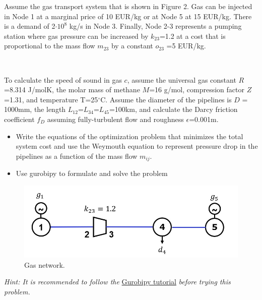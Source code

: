 \documentclass[10pt]{article}
\newenvironment{problem}[2][Problem]{\begin{trivlist}
\item[\hskip \labelsep {\bfseries #1}\hskip \labelsep {\bfseries #2.}]}{\end{trivlist}}
\begin{document}
\begin{problem}{6.3}

Assume the gas transport system that is shown in Figure 2. Gas can be injected in Node 1 at a marginal price of 10 EUR/kg or at Node 5 at 15 EUR/kg. There is a demand of 2$\cdot 10^8$ kg/s in Node 3. Finally, Node 2-3 represents a pumping station where gas pressure can be increased by $k_{23}$=1.2 at a cost that is proportional to the mass flow $m_{23}$  by a constant $o_{23}$ =5 EUR/kg.

\

To calculate the speed of sound in gas $c$, assume the universal gas constant $R$=8.314 J/molK, the molar mass of methane $M$=16 g/mol, compression factor $Z$=1.31, and temperature T=25$^{\circ}$C. Assume the diameter of the pipelines is $D$ = 1000mm, the length $L_{12}$=$L_{34}$=$L_{45}$=100km, and calculate the Darcy friction  coefficient $f_{D}$ assuming fully-turbulent flow and roughness $\epsilon$=0.001m. 

\begin{itemize}

\item[a)] Write the equations of the optimization problem that minimizes the total system cost and use the Weymouth equation to represent pressure drop in the pipelines as a function of the mass flow $m_{ij}$.


\item[b)] Use gurobipy to formulate and solve the problem


\end{itemize}

\begin{figure}
    \centering
    \includegraphics[width=0.6\linewidth]{figures/gas_network.jpg}
    \caption{Gas network.}
    \label{fig_network}
\end{figure}

\textit{Hint: It is recommended to follow the} \href{https://martavp.github.io/integrated-energy-grids/intro-gurobipy.html#}{Gurobipy tutorial} \textit{before trying this problem.}
\end{problem}

\end{document}

